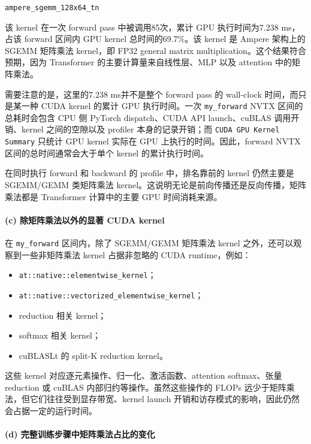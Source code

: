 \documentclass[12pt]{ctexart}
\begin{document}
\begin{center}
\texttt{ampere\_sgemm\_128x64\_tn}
\end{center}

该 kernel 在一次 forward pass 中被调用85次，累计 GPU 执行时间为7.238 ms，占该 forward 区间内 GPU kernel 总时间的69.7\%。该 kernel 是 Ampere 架构上的 SGEMM 矩阵乘法 kernel，即 FP32 general matrix multiplication。这个结果符合预期，因为 Transformer 的主要计算量来自线性层、MLP 以及 attention 中的矩阵乘法。

需要注意的是，这里的7.238 ms并不是整个 forward pass 的 wall-clock 时间，而只是某一种 CUDA kernel 的累计 GPU 执行时间。一次 \texttt{my\_forward} NVTX 区间的总耗时会包含 CPU 侧 PyTorch dispatch、CUDA API launch、cuBLAS 调用开销、kernel 之间的空隙以及 profiler 本身的记录开销；而 \texttt{CUDA GPU Kernel Summary} 只统计 GPU kernel 实际在 GPU 上执行的时间。因此，forward NVTX 区间的总时间通常会大于单个 kernel 的累计执行时间。

在同时执行 forward 和 backward 的 profile 中，排名靠前的 kernel 仍然主要是 SGEMM/GEMM 类矩阵乘法 kernel。这说明无论是前向传播还是反向传播，矩阵乘法都是 Transformer 计算中的主要 GPU 时间消耗来源。

\paragraph{(c) 除矩阵乘法以外的显著 CUDA kernel}

在 \texttt{my\_forward} 区间内，除了 SGEMM/GEMM 矩阵乘法 kernel 之外，还可以观察到一些非矩阵乘法 kernel 占据非忽略的 CUDA runtime，例如：

\begin{itemize}
    \item \texttt{at::native::elementwise\_kernel}；
    \item \texttt{at::native::vectorized\_elementwise\_kernel}；
    \item reduction 相关 kernel；
    \item softmax 相关 kernel；
    \item cuBLASLt 的 split-K reduction kernel。
\end{itemize}

这些 kernel 对应逐元素操作、归一化、激活函数、attention softmax、张量 reduction 或 cuBLAS 内部归约等操作。虽然这些操作的 FLOPs 远少于矩阵乘法，但它们往往受到显存带宽、kernel launch 开销和访存模式的影响，因此仍然会占据一定的运行时间。

\paragraph{(d) 完整训练步骤中矩阵乘法占比的变化}
\end{document}
